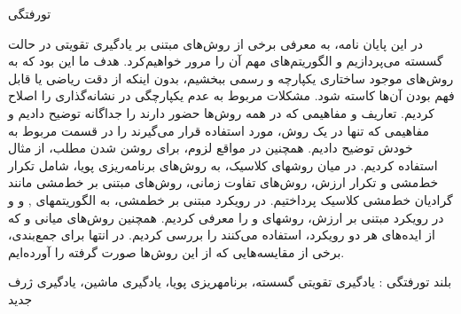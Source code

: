 


\pagestyle{empty}

‌تورفتگی

 در این پایان نامه، به معرفی برخی از روش‌های مبتنی بر یادگیری تقویتی در حالت گسسته می‌پردازیم و الگوریتم‌های مهم آن را مرور خواهیم‌کرد. 
هدف ما این بود که به روش‌های موجود ساختاری یکپارچه و رسمی ببخشیم،
 بدون اینکه از دقت ریاضی یا قابل فهم بودن آن‌ها کاسته شود.
 مشکلات مربوط به عدم یکپارچگی در نشانه‌گذاری را اصلاح کردیم.
 تعاریف و مفاهیمی که در همه روش‌ها حضور دارند را جداگانه توضیح دادیم و مفاهیمی که تنها در یک روش، مورد استفاده قرار می‌گیرند را در قسمت مربوط به خودش توضیح دادیم.
همچنین در مواقع لزوم، برای روشن شدن مطلب، از مثال استفاده کردیم.
در میان روش\nf های کلاسیک، به روش‌های برنامه‌ریزی پویا، شامل تکرار خط‌مشی و تکرار ارزش، روش‌های تفاوت زمانی، روش‌های مبتنی بر خط‌مشی مانند گرادیان خط‌مشی کلاسیک پرداختیم.  در رویکرد مبتنی بر خط\nf مشی، به الگوریتم\nf های
,
و
و در رویکرد مبتنی بر ارزش، روش\nf های
و
را معرفی کردیم. همچنین روش‌های میانی 
و
که از ایده‌های هر دو رویکرد، استفاده می‌کنند را بررسی کردیم.
در انتها برای جمع‌بندی، برخی از مقایسه‌هایی که از این روش‌ها صورت گرفته را آورده‌ایم.


‌بلند
‌تورفتگی : 
یادگیری تقویتی گسسته، برنامه\nf ریزی پویا، یادگیری ماشین، یادگیری ژرف
‌جدید
